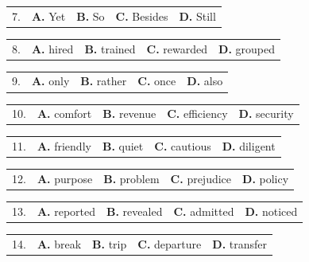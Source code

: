 \documentclass[UTF8,11pt]{ctexart}
\begin{document}
\noindent\begin{tabularx}{\linewidth}{@{}lXXXX@{}}7. & \textbf{A.} Yet & \textbf{B.} So & \textbf{C.} Besides & \textbf{D.} Still\\\end{tabularx}\par

\noindent\begin{tabularx}{\linewidth}{@{}lXXXX@{}}8. & \textbf{A.} hired & \textbf{B.} trained & \textbf{C.} rewarded & \textbf{D.} grouped\\\end{tabularx}\par

\noindent\begin{tabularx}{\linewidth}{@{}lXXXX@{}}9. & \textbf{A.} only & \textbf{B.} rather & \textbf{C.} once & \textbf{D.} also\\\end{tabularx}\par

\noindent\begin{tabularx}{\linewidth}{@{}lXXXX@{}}10. & \textbf{A.} comfort & \textbf{B.} revenue & \textbf{C.} efficiency & \textbf{D.} security\\\end{tabularx}\par

\noindent\begin{tabularx}{\linewidth}{@{}lXXXX@{}}11. & \textbf{A.} friendly & \textbf{B.} quiet & \textbf{C.} cautious & \textbf{D.} diligent\\\end{tabularx}\par

\noindent\begin{tabularx}{\linewidth}{@{}lXXXX@{}}12. & \textbf{A.} purpose & \textbf{B.} problem & \textbf{C.} prejudice & \textbf{D.} policy\\\end{tabularx}\par

\noindent\begin{tabularx}{\linewidth}{@{}lXXXX@{}}13. & \textbf{A.} reported & \textbf{B.} revealed & \textbf{C.} admitted & \textbf{D.} noticed\\\end{tabularx}\par

\noindent\begin{tabularx}{\linewidth}{@{}lXXXX@{}}14. & \textbf{A.} break & \textbf{B.} trip & \textbf{C.} departure & \textbf{D.} transfer\\\end{tabularx}\par
\end{document}
